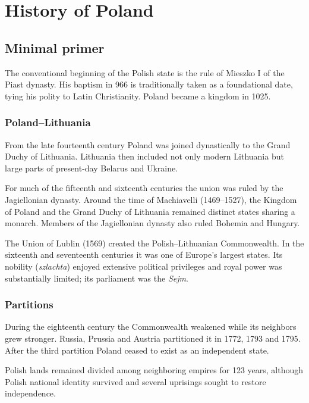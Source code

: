 \chapter{History of Poland}

\section{Minimal primer}

The conventional beginning of the Polish state is the rule of Mieszko I of the Piast dynasty. His baptism in 966 is traditionally taken as a foundational date, tying his polity to Latin Christianity. Poland became a kingdom in 1025.

\subsection{Poland--Lithuania}

From the late fourteenth century Poland was joined dynastically to the Grand Duchy of Lithuania. Lithuania then included not only modern Lithuania but large parts of present-day Belarus and Ukraine.

For much of the fifteenth and sixteenth centuries the union was ruled by the Jagiellonian dynasty. Around the time of Machiavelli (1469--1527), the Kingdom of Poland and the Grand Duchy of Lithuania remained distinct states sharing a monarch. Members of the Jagiellonian dynasty also ruled Bohemia and Hungary.

The Union of Lublin (1569) created the Polish--Lithuanian Commonwealth. In the sixteenth and seventeenth centuries it was one of Europe's largest states. Its nobility (\emph{szlachta}) enjoyed extensive political privileges and royal power was substantially limited; its parliament was the \emph{Sejm}.

\subsection{Partitions}

During the eighteenth century the Commonwealth weakened while its neighbors grew stronger. Russia, Prussia and Austria partitioned it in 1772, 1793 and 1795. After the third partition Poland ceased to exist as an independent state.

Polish lands remained divided among neighboring empires for 123 years, although Polish national identity survived and several uprisings sought to restore independence.

